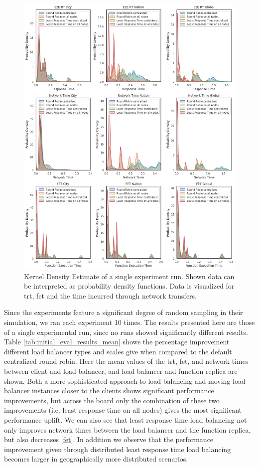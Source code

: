 \begin{figure}
    \centering
    \includegraphics[width=\linewidth]{graphics/graphs/initial_eval_pdfs_3x3.png}
    \caption{Kernel Density Estimate of a single experiment run. Shown data can be interpreted as probability density functions. Data is visualized for \gls{trt}, \gls{fet} and the time incurred through network transfers.}
    \label{fig:initial_eval_pdfs}
\end{figure}

Since the experiments feature a significant degree of random sampling in their simulation, we ran each experiment 10 times.
The results presented here are those of a single experimental run, since no runs showed significantly different results.
Table \ref{tab:initial_eval_results_mean} shows the percentage improvement different load balancer types and scales give when compared to the default centralized round robin.
Here the mean values of the \gls{trt}, \gls{fet}, and network times between client and load balancer, and load balancer and function replica are shown.
Both a more sophisticated approach to load balancing and moving load balancer instances closer to the clients shows significant performance improvements, but across the board only the combination of these two improvements (i.e. least response time on all nodes) gives the most significant performance uplift.
We can also see that least response time load balancing not only improves network times between the load balancer and the function replica, but also decreases \ref{fet}.
In addition we observe that the performance improvement given through distributed least response time load balancing becomes larger in geographically more distributed scenarios.

